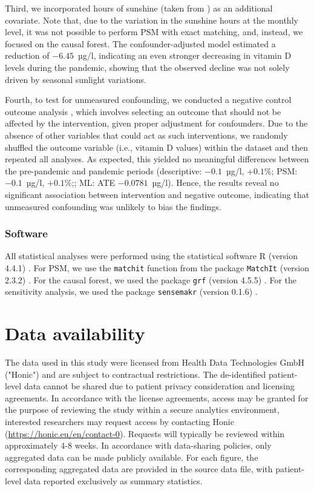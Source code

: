 \documentclass[12pt]{article}
\begin{document}
Third, we incorporated hours of sunshine (taken from \cite{DWD}) as an additional covariate. Note that, due to the variation in the sunshine hours at the monthly level, it was not possible to perform PSM with exact matching, and, instead, we focused on the causal forest. The confounder-adjusted model estimated a reduction of $-6.45$~µg/l, indicating an even stronger decreasing in vitamin D levels during the pandemic, showing that the observed decline was not solely driven by seasonal sunlight variations. 

Fourth, to test for unmeasured confounding, we conducted a negative control outcome analysis \cite{Lipsitch2010}, which involves selecting an outcome that should not be affected by the intervention, given proper adjustment for confounders. Due to the absence of other variables that could act as such interventions, we randomly shuffled the outcome variable (i.e., vitamin D values) within the dataset and then repeated all analyses. As expected, this yielded no meaningful differences between the pre-pandemic and pandemic periods (descriptive: $-0.1$~µg/l, $+0.1\%$; PSM: $-0.1$~µg/l, $+0.1\%$;; ML: ATE $-0.0781$~µg/l). Hence, the results reveal no significant association between intervention and negative outcome, indicating that unmeasured confounding was unlikely to bias the findings.


\subsubsection*{Software}

All statistical analyses were performed using the statistical software R (version 4.4.1) \cite{rsoftware}. For PSM, we use the \texttt{matchit} function from the package \texttt{MatchIt} (version 2.3.2) \cite{Ho2011}. For the causal forest, we used the package \texttt{grf} (version 4.5.5) \cite{grfpackage}. For the sensitivity analysis, we used the package \texttt{sensemakr} (version 0.1.6) \cite{Cinelli2020}.



\newpage
\section*{Data availability}
The data used in this study were licensed from Health Data Technologies GmbH ("Honic") and are subject to contractual restrictions. The de-identified patient-level data cannot be shared due to patient privacy consideration and licensing agreements. In accordance with the license agreements, access may be granted for the purpose of reviewing the study within a secure analytics environment, interested researchers may request access by contacting Honic (\href{https://honic.eu/en/contact-0}{https://honic.eu/en/contact-0}). Requests will typically be reviewed within approximately 4-8 weeks. In accordance with data-sharing policies, only aggregated data can be made publicly available. For each figure, the corresponding aggregated data are provided in the source data file, with patient-level data reported exclusively as summary statistics. 
\end{document}
